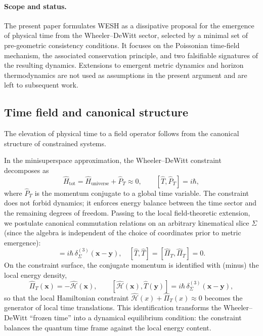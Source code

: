 \documentclass[12pt,a4paper]{article}
\numberwithin{equation}{section}
\begin{document}
\paragraph{Scope and status.}
The present paper formulates WESH as a dissipative proposal for the
emergence of physical time from the Wheeler--DeWitt sector, selected by
a minimal set of pre-geometric consistency conditions. It focuses on the
Poissonian time-field mechanism, the associated conservation principle,
and two falsifiable signatures of the resulting dynamics. Extensions to emergent metric dynamics and horizon thermodynamics
are not used as assumptions in the present argument and are left
to subsequent work.

\subsection{Time field and canonical structure}

The elevation of physical time to a field operator follows from the
canonical structure of constrained systems.

\noindent In the minisuperspace approximation, the Wheeler--DeWitt constraint
decomposes as
\begin{equation}
\hat{H}_{\text{tot}}=\hat{H}_{\text{universe}}+\hat{P}_T \approx 0, \qquad
[\hat{T},\hat{P}_T]=i\hbar,
\label{eq:minisspace-split}
\end{equation}
where $\hat{P}_T$ is the momentum conjugate to a global time variable. The
constraint does not forbid dynamics; it enforces energy balance between the
time sector and the remaining degrees of freedom. Passing to the local
field-theoretic extension, we postulate canonical commutation relations on an arbitrary
kinematical slice $\Sigma$ (since the algebra is independent of the choice of coordinates prior to metric emergence):
\begin{equation}
[\hat{T}(\mathbf{x}),\hat{\Pi}_T(\mathbf{y})]
= i\hbar\,\delta^{(3)}_{\Sigma}(\mathbf{x}-\mathbf{y}),\quad
[\hat{T},\hat{T}]=[\hat{\Pi}_T,\hat{\Pi}_T]=0.
\label{eq:canonical-commutators}
\end{equation}
On the constraint surface, the conjugate momentum is identified with (minus) the local energy density,
\begin{equation}
\hat{\Pi}_T(\mathbf{x})=-\hat{\mathcal{H}}(\mathbf{x}),\qquad
[\hat{\mathcal{H}}(\mathbf{x}),\hat{T}(\mathbf{y})]
= i\hbar\,\delta^{(3)}_{\Sigma}(\mathbf{x}-\mathbf{y}),
\label{eq:conjugacy}
\end{equation}
so that the local Hamiltonian constraint
$\hat{\mathcal{H}}(x)+\hat{\Pi}_T(x)\approx 0$ becomes the generator of
local time translations. This identification transforms the Wheeler--DeWitt
``frozen time'' into a dynamical equilibrium condition: the constraint
balances the quantum time frame against the local energy content.
\end{document}
